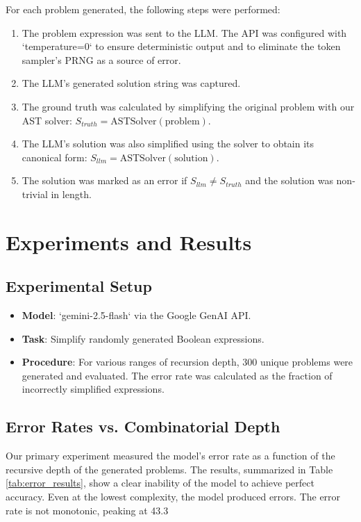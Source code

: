\documentclass[11pt,a4paper]{article}
\begin{document}
For each problem generated, the following steps were performed:
\begin{enumerate}
    \item The problem expression was sent to the LLM. The API was configured with `temperature=0` to ensure deterministic output and to eliminate the token sampler's PRNG as a source of error.
    \item The LLM's generated solution string was captured.
    \item The ground truth was calculated by simplifying the original problem with our AST solver: $S_{truth} = \text{ASTSolver}(\text{problem})$.
    \item The LLM's solution was also simplified using the solver to obtain its canonical form: $S_{llm} = \text{ASTSolver}(\text{solution})$.
    \item The solution was marked as an error if $S_{llm} \neq S_{truth}$ and the solution was non-trivial in length.
\end{enumerate}

\section{Experiments and Results}

\subsection{Experimental Setup}
\begin{itemize}
    \item \textbf{Model}: `gemini-2.5-flash` via the Google GenAI API.
    \item \textbf{Task}: Simplify randomly generated Boolean expressions.
    \item \textbf{Procedure}: For various ranges of recursion depth, 300 unique problems were generated and evaluated. The error rate was calculated as the fraction of incorrectly simplified expressions.
\end{itemize}

\subsection{Error Rates vs. Combinatorial Depth}
Our primary experiment measured the model's error rate as a function of the recursive depth of the generated problems. The results, summarized in Table \ref{tab:error_results}, show a clear inability of the model to achieve perfect accuracy. Even at the lowest complexity, the model produced errors. The error rate is not monotonic, peaking at 43.3%
\end{document}
